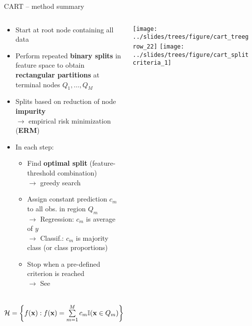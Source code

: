 \begin{frame}{CART -- method summary}

\footnotesize

 
  

\medskip

\begin{columns}[T, totalwidth=\textwidth]
\begin{column}{0.6\textwidth}
\begin{itemize}
  \item Start at root node containing all data
  \item Perform repeated \textbf{binary splits} in feature space to obtain
  \textbf{rectangular partitions} at terminal nodes $Q_1, \dots, Q_M$
  \item Splits based on reduction of node \textbf{impurity} \\
  $\rightarrow$ empirical risk minimization (\textbf{ERM})
  \item In each step:
  \begin{itemize}
    \item Find \textbf{optimal split} (feature-threshold combination) \\
    $\rightarrow$ greedy search
    \item Assign constant prediction $c_m$ to all obs. in region $Q_m$\\
    $\rightarrow$ Regression: $c_m$ is average of $y$ \\
    $\rightarrow$ Classif.: $c_m$ is majority class (or class proportions)
    
  \item Stop when a pre-defined criterion is reached\\
  $\rightarrow$ See 
  \end{itemize}
\end{itemize}

\medskip

     ~~
$\mathcal{H} = \left\{ f(\mathbf{x}): f(\mathbf{x}) = \sum\limits_{m = 1}^M c_m \mathbb{I}(\mathbf{x} \in Q_m) 
\right\}$

\end{column}
\begin{column}{0.45\textwidth}
\texttt{[image: ../slides/trees/figure/cart\_treegrow\_22]}
\texttt{[image:    ../slides/trees/figure/cart\_splitcriteria\_1]} 
\end{column}
\end{columns}



\end{frame}
